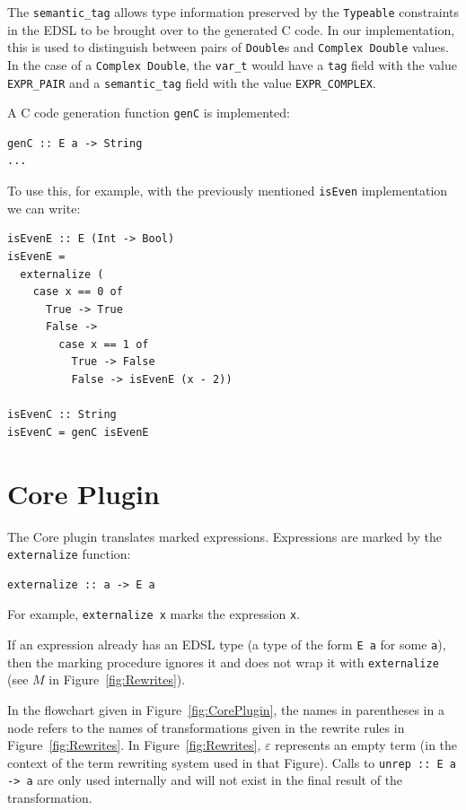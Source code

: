 \documentclass[sigplan,anonymous,review]{acmart}
\newcommand{\ttt}{\texttt}
\begin{document}
The \ttt{semantic\_tag} allows type information preserved by the \ttt{Typeable} constraints
in the EDSL to be brought over to the generated C code. In our implementation, this is
used to distinguish between pairs of \ttt{Double}s and \ttt{Complex Double} values. In the
case of a \ttt{Complex Double}, the \ttt{var\_t} would have a \ttt{tag} field with the value
\ttt{EXPR\_PAIR} and a \ttt{semantic\_tag} field with the value \ttt{EXPR\_COMPLEX}.

A C code generation function \ttt{genC} is implemented:

\begin{lstlisting}
genC :: E a -> String
...
\end{lstlisting}

To use this, for example, with the previously mentioned \ttt{isEven} implementation we
can write:
\newpage
\begin{lstlisting}
isEvenE :: E (Int -> Bool)
isEvenE =
  externalize (
    case x == 0 of
      True -> True
      False ->
        case x == 1 of
          True -> False
          False -> isEvenE (x - 2))

isEvenC :: String
isEvenC = genC isEvenE
\end{lstlisting}

\section{Core Plugin}
\label{sec:CorePlugin}

The Core plugin translates marked expressions. Expressions are marked by
the \ttt{externalize} function:

\begin{lstlisting}
externalize :: a -> E a
\end{lstlisting}

For example, \ttt{externalize x} marks the expression \ttt{x}.

If an expression already has an EDSL type (a type of the form \ttt{E a} for some
\ttt{a}), then the marking procedure ignores it and does not wrap it with
\ttt{externalize} (see $M$ in Figure~\ref{fig:Rewrites}).

In the flowchart given in Figure~\ref{fig:CorePlugin}, the names in parentheses in a node refers
to the names of transformations given in the rewrite rules in Figure~\ref{fig:Rewrites}. In Figure~\ref{fig:Rewrites},
$\varepsilon$ represents an empty term (in the context of the term rewriting system used in that Figure). Calls
to \ttt{unrep :: E a -> a} are only used internally and will not exist in
the final result of the transformation.
\end{document}
